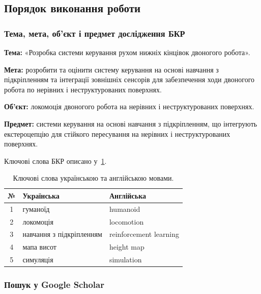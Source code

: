 \documentclass{article}
\begin{document}
\subsection{Порядок виконання роботи}

\subsubsection{Тема, мета, об'єкт і предмет дослідження БКР}

\textbf{Тема:} «Розробка системи керування рухом нижніх кінцівок двоногого робота».

\textbf{Мета:} розробити та оцінити систему керування на основі навчання з підкріпленням та інтеграції зовнішніх сенсорів для забезпечення ходи двоногого робота по нерівних і неструктурованих поверхнях.

\textbf{Об'єкт:} локомоція двоногого робота на нерівних і неструктурованих поверхнях.

\textbf{Предмет:} системи керування на основі навчання з підкріпленням, що інтегрують екстероцепцію для стійкого пересування на нерівних і неструктурованих поверхнях.

Ключові слова БКР описано у~\cref{tab:keywords}.

\begin{table}[H]
  \caption{Ключові слова українською та англійською мовами.}
  \label{tab:keywords}
  \centering
  \begin{tabular}{|c|l|l|}
    \hline
    \textbf{№} & \textbf{Українська}              & \textbf{Англійська}           \\
    \hline
    1          & гуманоїд                         & humanoid                      \\
    \hline
    2          & локомоція                        & locomotion                    \\
    \hline
    3          & навчання з підкріпленням         & reinforcement learning        \\
    \hline
    4          & мапа висот                       & height map                    \\
    \hline
    5          & симуляція                        & simulation                    \\
    \hline
  \end{tabular}
\end{table}

\subsubsection{Пошук у Google Scholar}
\end{document}

